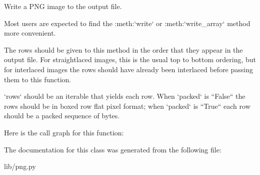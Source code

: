 \begin{DoxyVerb}Write a PNG image to the output file.

Most users are expected to find the :meth:`write` or
:meth:`write_array` method more convenient.

The rows should be given to this method in the order that
they appear in the output file.  For straightlaced images,
this is the usual top to bottom ordering, but for interlaced
images the rows should have already been interlaced before
passing them to this function.

`rows` should be an iterable that yields each row.  When
`packed` is ``False`` the rows should be in boxed row flat pixel
format; when `packed` is ``True`` each row should be a packed
sequence of bytes.
\end{DoxyVerb}
 Here is the call graph for this function\+:


The documentation for this class was generated from the following file\+:\begin{DoxyCompactItemize}
\item 
lib/png.\+py\end{DoxyCompactItemize}
